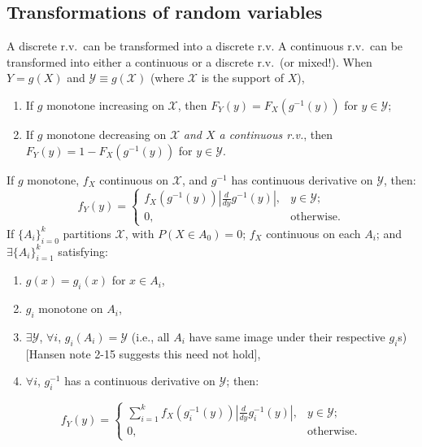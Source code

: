\documentclass[8pt,letterpaper, landscape]{extarticle} %
\newcommand{\X}{\ensuremath{\mathcal{X}}}
\newcommand{\Y}{\ensuremath{\mathcal{Y}}}
\begin{document}
\begin{multicols}{3}
\begin{description}
\subsection{Transformations of random variables}
 A discrete r.v.\ can be transformed into a discrete r.v. A continuous r.v.\ can be transformed into either a continuous or a discrete r.v.\ (or mixed!). When $ Y = g(X) $ and $ \Y \equiv g(\X) $ (where $ \X $ is the support of $ X $),
\begin{enumerate}
\item If $ g $ monotone increasing on $ \X $, then $ F_Y(y) = F_X(g^{-1}(y)) $ for $ y \in \Y $;
\item If $ g $ monotone decreasing on $ \X $ \textit{and $ X $ a continuous r.v.}, then $ F_Y(y) = 1 - F_X(g^{-1}(y)) $ for $ y \in \Y $.
\end{enumerate}
If $ g $ monotone, $ f_X $ continuous on $ \X $, and $ g^{-1} $ has continuous derivative on $ \Y $, then:
$$ f_Y(y) = \begin{cases}
f_X \left( g^{-1}(y) \right) \left| \tfrac{d}{dy} g^{-1}(y) \right|, & y \in \Y; \\
0, & \text{otherwise.}
\end{cases} $$
If $ \{A_i \}_{i=0}^k $ partitions $ \X $, with $ P (X \in A_0) = 0 $; $ f_X $ continuous on each $ A_i $; and $ \exists \{A_i \}_{i=1}^k $ satisfying:
\begin{enumerate}
\item $ g(x) = g_i(x) $ for $ x \in A_i $,
\item $ g_i $ monotone on $ A_i $,
\item $ \exists \Y $, $ \forall i $, $ g_i(A_i) = \Y $ (i.e., all $ A_i $ have same image under their respective $ g_i $s) [Hansen note 2-15 suggests this need not hold],
\item $ \forall i $, $ g_i^{-1} $ has a continuous derivative on $ \Y $; then:
\end{enumerate}
$$ f_Y(y) = \begin{cases}
\sum_{i=1}^k f_X \left( g_i^{-1}(y) \right) \left| \tfrac{d}{dy} g_i^{-1}(y) \right|, & y \in \Y; \\
0, & \text{otherwise.}
\end{cases} $$


\end{description}
\end{multicols}
\end{document}
